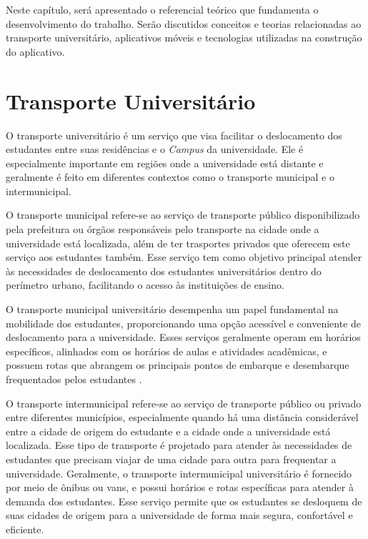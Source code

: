 \documentclass[
    12pt,                   %
    openright,              %
    oneside,                %
    a4paper,                %
    sumario=tradicional,    %
    english,                %
    brazil,                 %
    ]{abntex2}
\begin{document}
Neste capítulo, será apresentado o referencial teórico que fundamenta o desenvolvimento do trabalho. Serão discutidos conceitos e teorias relacionadas ao transporte universitário, aplicativos móveis e tecnologias utilizadas na construção do aplicativo. 

\section{Transporte Universitário}
\label{sec:transporte-universitario}

O transporte universitário é um serviço que visa facilitar o deslocamento dos estudantes entre suas residências e o \textit{Campus} da universidade. Ele é especialmente importante em regiões onde a universidade está distante e geralmente é feito em diferentes contextos como o transporte municipal e o intermunicipal.

     O transporte municipal refere-se ao serviço de transporte público disponibilizado pela prefeitura ou órgãos responsáveis pelo transporte na cidade onde a universidade está localizada, além de ter trasportes privados que oferecem este serviço aos estudantes também. Esse serviço tem como objetivo principal atender às necessidades de deslocamento dos estudantes universitários dentro do perímetro urbano, facilitando o acesso às instituições de ensino.
    
    O transporte municipal universitário desempenha um papel fundamental na mobilidade dos estudantes, proporcionando uma opção acessível e conveniente de deslocamento para a universidade. Esses serviços geralmente operam em horários específicos, alinhados com os horários de aulas e atividades acadêmicas, e possuem rotas que abrangem os principais pontos de embarque e desembarque frequentados pelos estudantes \cite{miranda2019infraestrutura}.

    
     O transporte intermunicipal refere-se ao serviço de transporte público ou privado entre diferentes municípios, especialmente quando há uma distância considerável entre a cidade de origem do estudante e a cidade onde a universidade está localizada. Esse tipo de transporte é projetado para atender às necessidades de estudantes que precisam viajar de uma cidade para outra para frequentar a universidade. Geralmente, o transporte intermunicipal universitário é fornecido por meio de ônibus ou vans, e possui horários e rotas específicas para atender à demanda dos estudantes. Esse serviço permite que os estudantes se desloquem de suas cidades de origem para a universidade de forma mais segura, confortável e eficiente.
    
\end{document}
